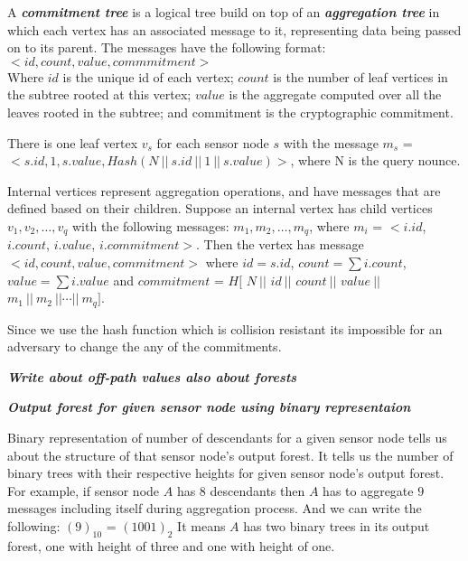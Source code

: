 	\begin{definition}
		A \textbf{\textit{commitment tree}} is a logical tree build on top of an \textbf{\textit{aggregation tree}} in which each vertex has an associated message to it, representing data being passed on to its parent. The messages have the following format:\\

		$<id, count, value, commmitment>$\\
		\newline
		Where $id$ is the unique id of each vertex; $count$ is the number of leaf vertices in the subtree rooted at this vertex; $value$ is the aggregate computed over all the leaves rooted in the subtree; and commitment is the cryptographic commitment.

	\end{definition}

	There is one leaf vertex $v_{s}$ for each sensor node $s$ with the message $m_{s}$ = $< s.id, 1,s.value, Hash( N\ ||\  s.id\ ||\  1\  ||\  s.value) > $, where N is the query nounce.

	Internal vertices represent aggregation operations, and have messages that are defined based on their children. Suppose an internal vertex has child vertices $v_{1}, v_{2},\dotsc, v_{q}$ with the following messages: $m_{1}, m_{2},\dotsc, m_{q}$, where $m_{i}$ = $<i.id$, $i.count$, $i.value$, $i.commitment>$.
	Then the vertex has message $<id, count, value, commitment>$ where $id = s.id$, $count = \sum{i.count}$, $value = \sum{i.value}$ and $commitment$ = $H[$ $N\ || $ $id\ || $ $count\ || $ $value\ ||$ $m_{1}\ ||\ m_{2}\ || \dotsb ||\ m_{q}]$.

	Since we use the hash function which is collision resistant its impossible for an adversary to change the any of the commitments.

	\textit{\textbf{Write about off-path values also about forests }}

	\textit{\textbf{Output forest for given sensor node using binary representaion}}

	Binary representation of number of descendants for a given sensor node tells us about the structure of that sensor node's output forest. 
	It tells us the number of binary trees with their respective heights for given sensor node's output forest.
	For example, if sensor node $A$ has $8$ descendants then $A$ has to aggregate $9$ messages including itself during aggregation process.
	And we can write the following:	$(9)_{10}$ = $(1001)_{2}$ 
	It means $A$ has two binary trees in its output forest, one with height of three and one with height of one.

